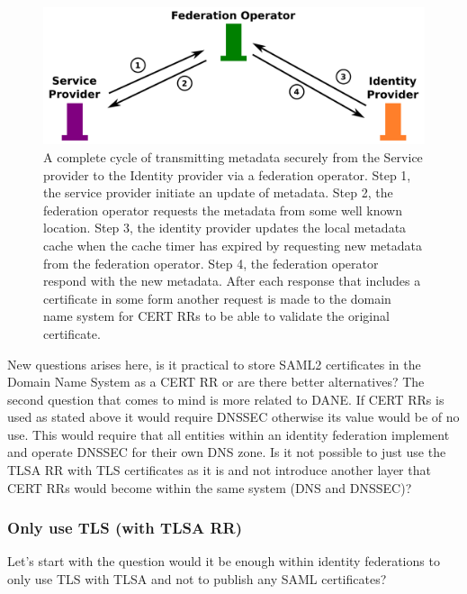 \begin{figure}[ht]
\begin{center}
\includegraphics[scale=1]{Figures/saml2certsascertrr.png}
\end{center}
\caption{A complete cycle of transmitting metadata securely from the Service provider to the Identity provider via a federation operator.
Step 1, the service provider initiate an update of metadata.
Step 2, the federation operator requests the metadata from some well known location.
Step 3, the identity provider updates the local metadata cache when the cache timer has expired by requesting new metadata from the federation operator.
Step 4, the federation operator respond with the new metadata.
After each response that includes a certificate in some form another request is made to the domain name system for CERT RRs to be able to validate the original certificate.
\label{ch4:saml2certsascertrr}}
\end{figure}



New questions arises here, is it practical to store SAML2 certificates in the Domain Name System as a CERT RR or are there better alternatives?
The second question that comes to mind is more related to DANE.
If CERT RRs is used as stated above it would require DNSSEC otherwise its value would be of no use.
This would require that all entities within an identity federation implement and operate DNSSEC for their own DNS zone.
Is it not possible to just use the TLSA RR with TLS certificates as it is and not introduce another layer that CERT RRs would become within the same system (DNS and DNSSEC)?

\subsubsection{Only use TLS (with TLSA RR)}
\label{subsec:only-tlsa-rr-with-tls}
Let's start with the question would it be enough within identity federations to only use TLS with TLSA and not to publish any SAML certificates?

